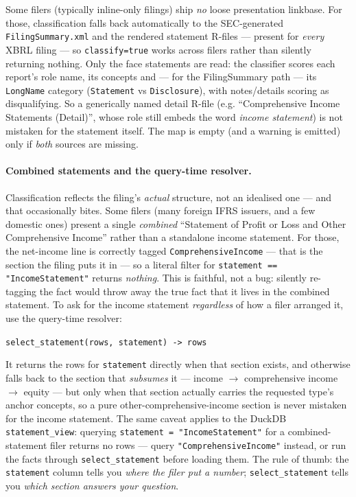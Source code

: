 \documentclass[11pt,a4paper]{report}
\newcommand{\sig}[1]{\medskip\noindent\texttt{#1}\par\medskip}
\begin{document}
\noindent Some filers (typically inline-only filings) ship \emph{no} loose presentation
linkbase. For those, classification falls back automatically to the SEC-generated
\texttt{FilingSummary.xml} and the rendered statement R-files --- present for \emph{every}
XBRL filing --- so \texttt{classify=true} works across filers rather than silently returning
nothing. Only the face statements are read: the classifier scores each report's role name, its
concepts and --- for the FilingSummary path --- its \texttt{LongName} category
(\texttt{Statement} vs \texttt{Disclosure}), with notes/details scoring as disqualifying. So a
generically named detail R-file (e.g. ``Comprehensive Income Statements (Detail)'', whose role still
embeds the word \emph{income statement}) is not mistaken for the statement itself. The map is empty
(and a warning is emitted) only if \emph{both} sources are missing.

\paragraph{Combined statements and the query-time resolver.} Classification reflects the filing's
\emph{actual} structure, not an idealised one --- and that occasionally bites. Some filers (many
foreign IFRS issuers, and a few domestic ones) present a single \emph{combined} ``Statement of Profit
or Loss and Other Comprehensive Income'' rather than a standalone income statement. For those, the
net-income line is correctly tagged \texttt{ComprehensiveIncome} --- that is the section the filing
puts it in --- so a literal filter for \texttt{statement == "IncomeStatement"} returns \emph{nothing}.
This is faithful, not a bug: silently re-tagging the fact would throw away the true fact that it lives
in the combined statement. To ask for the income statement \emph{regardless} of how a filer arranged
it, use the query-time resolver:

\sig{select\_statement(rows, statement) -> rows}

\noindent It returns the rows for \texttt{statement} directly when that section exists, and otherwise
falls back to the section that \emph{subsumes} it --- income $\to$ comprehensive income $\to$ equity ---
but only when that section actually carries the requested type's anchor concepts, so a pure
other-comprehensive-income section is never mistaken for the income statement. The same caveat applies
to the DuckDB \texttt{statement\_view}: querying \texttt{statement = "IncomeStatement"} for a
combined-statement filer returns no rows --- query \texttt{"ComprehensiveIncome"} instead, or run the
facts through \texttt{select\_statement} before loading them. The rule of thumb: the \texttt{statement}
column tells you \emph{where the filer put a number}; \texttt{select\_statement} tells you \emph{which
section answers your question}.
\end{document}

